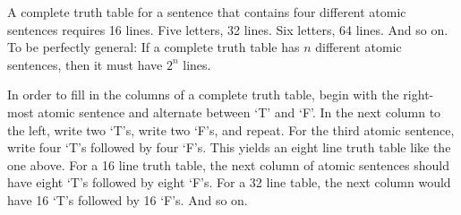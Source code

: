 A complete truth table for a sentence that contains four different atomic sentences requires 16 lines. Five letters, 32 lines. Six letters, 64 lines. And so on. To be perfectly general: If a complete truth table has $n$ different atomic sentences, then it must have $2^n$ lines.

In order to fill in the columns of a complete truth table, begin with the right-most atomic sentence and alternate between `T' and `F'. In the next column to the left, write two `T's, write two `F's, and repeat. For the third atomic sentence, write four `T's followed by four `F's. This yields an eight line truth table like the one above. For a 16 line truth table, the next column of atomic sentences should have eight `T's followed by eight `F's. For a 32 line table, the next column would have 16 `T's followed by 16 `F's. And so on.


